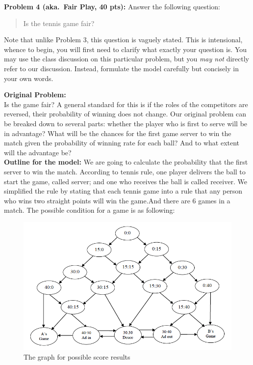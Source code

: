 \documentclass[12pt]{article}
\begin{document}
\vskip0.25in
\noindent\textbf{Problem 4 (aka.\ Fair Play, 40 pts):}
Answer the following question:
\begin{verse}
Is the tennis game fair?
\end{verse}
Note that unlike Problem 3, this question is vaguely stated.
This is intensional, whence to begin, you will first need to clarify
what exactly your question is.
You may use the class discussion on this particular 
problem, but you \emph{may not} directly refer to our 
discussion.  Instead, formulate the model carefully but concisely in 
your own words.   

\vskip0.25in

\noindent\textbf{Original Problem:}  
\\ Is the game fair? A general standard for this is if the roles of the competitors are reversed, their probability of
winning does not change. Our original problem can be breaked down to several parts: whether the player who is first to serve will be in advantage?  What will be the chances for the first game server to win the match given the probability of winning rate for each ball? And to what extent will the advantage be?\\

\noindent\textbf{Outline for the model:}   We are going to calculate the probability that the first server to win the match. According to tennis rule, one player delivers the ball to start the game, called server; and one who receives the ball is called receiver. We simplified the rule by stating that each tennis game into a rule that any person who wins two straight points will win the game.And there are 6 games in a match. The possible condition for a game is as following:

\begin{figure}[h]
    \begin{center}
        \includegraphics[scale=0.6]{graph2.png}
    \end{center}
    \caption{The graph for possible score results}
    \label{fig:branch}
\end{figure}
\end{document}
